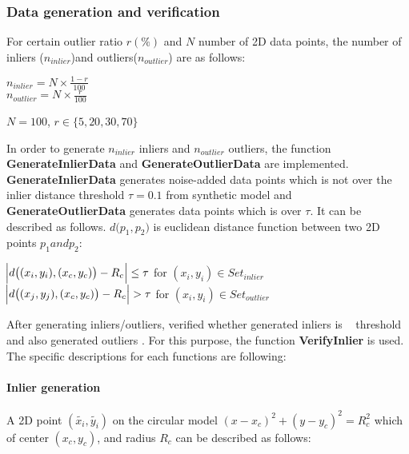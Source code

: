 \documentclass[paper=a4, fontsize=11pt]{scrartcl} %
\numberwithin{equation}{section} %
\numberwithin{figure}{section} %
\numberwithin{table}{section} %
\newcommand{\funcname}[1]{\textbf{#1}}
\begin{document}
\subsubsection{Data generation and verification}

For certain outlier ratio $r  (\%)$ and $N$ number of 2D data points, the number of inliers ($n_{inlier}$)and outliers($n_{outlier}$) are as follows:

\begin{center}
$n_{inlier} = N \times \frac{1 - r}{100} $ \\
$n_{outlier} = N \times \frac{r}{100} $  
\end{center}

\begin{center}
$N = 100$, $r \in \{5, 20, 30, 70\}$
\end{center}

In order to generate $n_{inlier}$ inliers and $n_{outlier}$ outliers, the function \funcname{GenerateInlierData} and \funcname{GenerateOutlierData} are implemented. \funcname{GenerateInlierData} generates noise-added data points which is not over the inlier distance threshold $\tau = 0.1$ from synthetic model and \funcname{GenerateOutlierData} generates data points which is over $\tau$. It can be described as follows. $d\big(p_{1}, p_{2}\big)$ is euclidean distance function between two 2D points $p_{1} and p_{2}$:

\begin{center}
$\abs{d \big( (x_{i}, y_{i}), (x_{c}, y_{c}) \big) - R_{c}} \leq \tau$  \qquad for $(x_{i}, y_{i}) \in Set_{inlier}$ \\
$\abs{d \big( (x_{j}, y_{j}), (x_{c}, y_{c}) \big) - R_{c}} > \tau $ \qquad for $(x_{i}, y_{i}) \in Set_{outlier}$ 
\end{center}


After generating inliers/outliers, verified whether generated inliers is ~ threshold and also generated outliers . For this purpose, the function \funcname{VerifyInlier} is used. The specific descriptions for each functions are following:

\paragraph{Inlier generation}

A 2D point $(\tilde{x_{i}}, \tilde{y_{i}})$ on the circular model $(x-x_{c})^{2} + (y-y_c)^{2} = R_{c}^{2}$ which of center $(x_{c}, y_{c})$, and radius $R_{c}$ can be described as follows:
\end{document}

